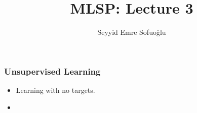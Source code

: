 \documentclass[a4,xcolor=dvipsnames]{beamer}
\title{MLSP: Lecture 3}
\author{Seyyid Emre Sofuo\u{g}lu}
\begin{document}
\setlength{\leftmargini}{0.2cm}

\begin{frame}
    \maketitle
\end{frame}
\begin{frame}
    \frametitle{Unsupervised Learning}
    \begin{itemize}
        \item Learning with no targets.
        \item 
    \end{itemize}
\end{frame}
\end{document}
